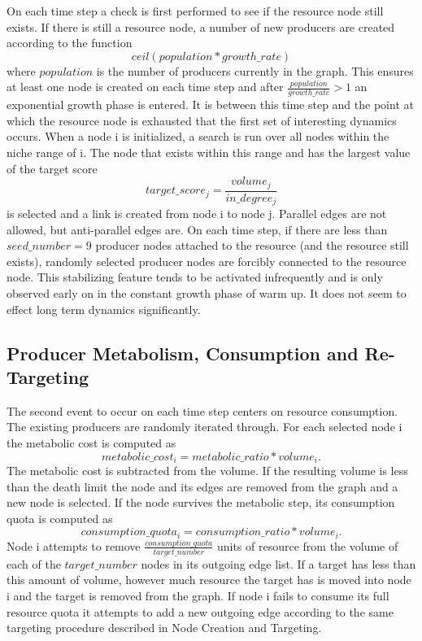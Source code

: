 \documentclass{paper}
\begin{document}
	On each time step a check is first performed to see if the resource node still exists. If there is still a resource node, a number of new producers are created according to the function $$ceil( population * growth\_rate )$$ where $population$ is the number of producers currently in the graph. This ensures at least one node is created on each time step and after $\frac{population}{growth\_rate}>1$ an exponential growth phase is entered. It is between this time step and the point at which the resource node is exhausted that the first set of interesting dynamics occurs. 
	When a node i is initialized, a search is run over all nodes within the niche range of i. The node that exists within this range and has the largest value of the target score
	$$target\_score_j = \frac{volume_j}{in\_degree_j}$$
	is selected and a link is created from node i to node j. Parallel edges are not allowed, but anti-parallel edges are. On each time step, if there are less than $seed\_number=9$ producer nodes attached to the resource (and the resource still exists), randomly selected producer nodes are forcibly connected to the resource node. This stabilizing feature tends to be activated infrequently and is only observed early on in the constant growth phase of warm up. It does not seem to effect long term dynamics significantly. 
	
	\subsection{Producer Metabolism, Consumption and Re-Targeting}
	
	The second event to occur on each time step centers on resource consumption. The existing producers are randomly iterated through. For each selected node i the metabolic cost is computed as
	$$metabolic\_cost_i = metabolic\_ratio * volume_i.$$
	The metabolic cost is subtracted from the volume. If the resulting volume is less than the death limit the node and its edges are removed from the graph and a new node is selected. If the node survives the metabolic step, its consumption quota is computed as
	$$consumption\_quota_i = consumption\_ratio * volume_i.$$
	Node i attempts to remove $\frac{consumption\_quota}{target\_number}$ units of resource from the volume of each of the $target\_number$ nodes in its outgoing edge list. If a target has less than this amount of volume, however much resource the target has is moved into node i and the target is removed from the graph. If node i fails to consume its full resource quota it attempts to add a new outgoing edge according to the same targeting procedure described in Node Creation and Targeting. 
	
\end{document}
